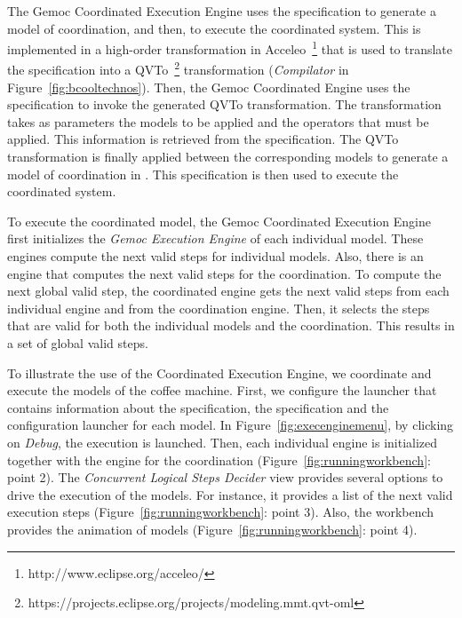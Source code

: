 The Gemoc Coordinated Execution Engine uses the \bflow specification to generate a model of coordination, and then, to execute the coordinated system. This is implemented in a high-order transformation in Acceleo~\footnote{http://www.eclipse.org/acceleo/} that is used to translate the \bcool specification into a QVTo~\footnote{https://projects.eclipse.org/projects/modeling.mmt.qvt-oml} transformation (\emph{Compilator} in Figure~\ref{fig:bcooltechnos}). Then, the Gemoc Coordinated Engine uses the \bflow specification to invoke the generated QVTo transformation. The transformation takes as parameters the models to be applied and the operators that must be applied. This information is retrieved from the \bflow specification. The QVTo transformation is finally applied between the corresponding models to generate a model of coordination in \ccsl. This specification is then used to execute the coordinated system.  

To execute the coordinated model, the Gemoc Coordinated Execution Engine first initializes the \emph{Gemoc Execution Engine} of each individual model. These engines compute the next valid steps for individual models. Also, there is an engine that computes the next valid steps for the coordination. To compute the next global valid step, the coordinated engine gets the next valid steps from each individual engine and from the coordination engine. Then, it selects the steps that are valid for both the individual models and the coordination. This results in a set of global valid steps. 

To illustrate the use of the Coordinated Execution Engine, we coordinate and execute the models of the coffee machine. First, we configure the launcher that contains information about the \bcool specification, the \bflow specification and the configuration launcher for each model. In Figure~\ref{fig:execenginemenu}, by clicking on \emph{Debug}, the execution is launched. Then, each individual engine is initialized together with the engine for the coordination (Figure~\ref{fig:runningworkbench}: point 2). The \emph{Concurrent Logical Steps Decider} view provides several options to drive the execution of the models. For instance, it provides a list of the next valid execution steps (Figure~\ref{fig:runningworkbench}: point 3). Also, the workbench provides the animation of models (Figure~\ref{fig:runningworkbench}: point 4). 

